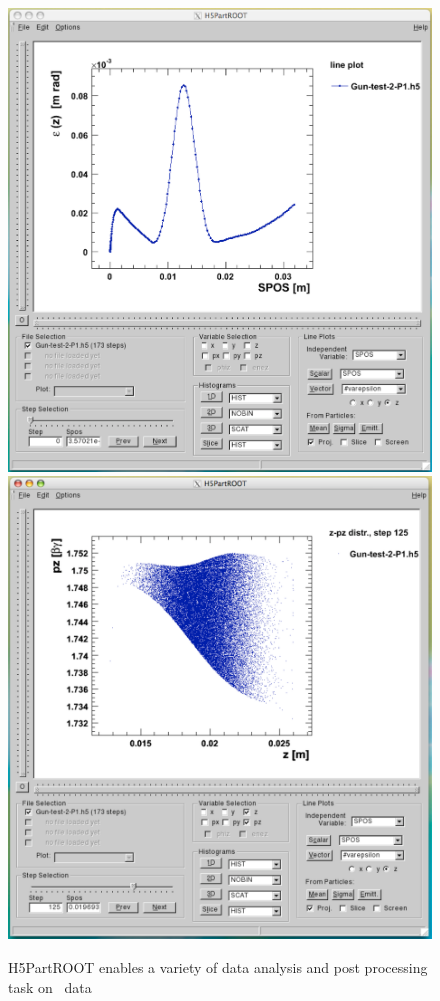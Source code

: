 \begin{figure}[ht]
 \begin{center}
 \includegraphics[width=0.45\linewidth,angle=0]{figures/H5rootPicture1}
  \includegraphics[width=0.45\linewidth,angle=0]{figures/H5rootPicture2}
  \caption{H5PartROOT enables a variety of data analysis and post processing task on \opal\ data}
  \label{fig:h5root1}
 \end{center}
\end{figure}



